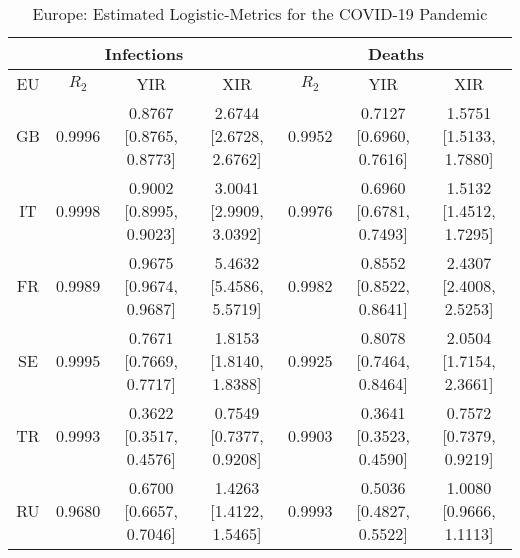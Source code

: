\documentclass[journal]{IEEEtran}
\theoremstyle{plain}
\theoremstyle{definition}
\theoremstyle{remark}
\begin{document}
\begin{table*}[t]
	\caption{Europe: Estimated Logistic-Metrics for the COVID-19 Pandemic}
	\centering
	\def\arraystretch{1.5}\begin{tabular}{|c|c|c|c|c|c|c|}
	\hline
	\multicolumn{4}{|c||}{Infections}&
	\multicolumn{3}{c|}{Deaths}\\
	\hline\hline
	EU & $R_2$ & YIR & XIR & $R_2$ & YIR & XIR \\
	\hline\hline
	GB& 0.9996& 0.8767 [0.8765, 0.8773]& 2.6744 [2.6728, 2.6762]  &  0.9952 & 0.7127 [0.6960, 0.7616] &  1.5751	[1.5133, 1.7880] \\
	\hline
	IT&  0.9998&  0.9002 [0.8995, 0.9023]& 3.0041 [2.9909, 3.0392]
	  & 0.9976  & 0.6960 [0.6781, 0.7493] &  1.5132	[1.4512, 1.7295] \\
	\hline
	FR&  0.9989&  0.9675 [0.9674, 0.9687]& 5.4632 [5.4586, 5.5719]
	& 0.9982 & 	0.8552	[0.8522, 0.8641] & 2.4307 [2.4008,	2.5253] \\
	\hline
	SE&  0.9995& 0.7671	[0.7669,	0.7717]
	 & 1.8153	[1.8140,	1.8388]& 0.9925& 0.8078	[0.7464, 0.8464]  & 2.0504	[1.7154, 2.3661]\\
	\hline
	TR&  0.9993&  0.3622	[0.3517,	0.4576]
	& 0.7549 [0.7377,	0.9208]& 0.9903	& 0.3641 [0.3523, 0.4590]  & 0.7572 [0.7379, 0.9219] \\
	\hline
	RU&  0.9680& 0.6700	[0.6657,	0.7046]
	 & 1.4263	[1.4122,	1.5465] &0.9993 &  0.5036 [0.4827, 0.5522]&  1.0080 [0.9666, 1.1113] \\
	\hline
\end{tabular}
\label{table_eu}
\end{table*}
\end{document}
